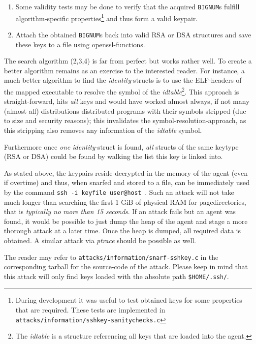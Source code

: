 \begin{enumerate}
	\item Some validity tests may be done to verify that the acquired
	\texttt{BIGNUM}s fulfill algorithm-specific properties\footnote{During
	development it was useful to test obtained keys for some properties that
	are required. These tests are implemented in
	\texttt{attacks/information/sshkey-sanitychecks.c}} and thus form a
	valid keypair.

	\item Attach the obtained \texttt{BIGNUM}s back into valid RSA or DSA
	structures and save these keys to a file using openssl-functions.
	
\end{enumerate}
	
The search algorithm (2,3,4) is far from perfect but works rather well.  To
create a better algorithm remains as an exercise to the interested reader. For
instance, a much better algorithm to find the \emph{identity}-structs is to use
the ELF-headers of the mapped executable to resolve the symbol of the
\emph{idtable}\footnote{The \emph{idtable} is a structure referencing all keys
that are loaded into the agent.}. This approach is straight-forward, hits
\emph{all} keys and would have worked almost always, if not many (almost all)
distributions distributed programs with their symbols stripped (due to size and
security reasons); this invalidates the symbol-resolution-approach, as this
stripping also removes any information of the \emph{idtable} symbol.

Furthermore once \emph{one} \emph{identity}-struct is found, \emph{all} structs
of the same keytype (RSA or DSA) could be found by walking the list this key is
linked into.

As stated above, the keypairs reside decrypted in the memory of the agent (even
if overtime) and thus, when snarfed and stored to a file, can be immediately
used by the command \texttt{ssh~-i~keyfile~user@host}~.  Such an attack will not
take much longer than searching the first 1 GiB of physical RAM for
pagedirectories, that is \emph{typically no more than 15 seconds}. If an attack
fails but an agent was found, it would be possible to just dump the heap of the
agent and stage a more thorough attack at a later time. Once the heap is dumped,
all required data is obtained. A similar attack via \emph{ptrace} should be
possible as well.

The reader may refer to \texttt{attacks/information/snarf-sshkey.c} in the
corresponding tarball for the source-code of the attack. Please keep in mind
that this attack will only find keys loaded with the absolute path
\texttt{\$HOME/.ssh/}.


